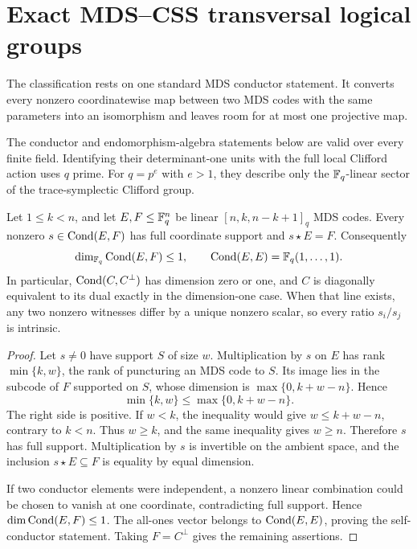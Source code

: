 \section{Exact MDS--CSS transversal logical groups}
\label{sec:exact-logical}

The classification rests on one standard MDS conductor statement.  It
converts every nonzero coordinatewise map between two MDS codes with the same
parameters into an isomorphism and leaves room for at most one projective
map.

The conductor and endomorphism-algebra statements below are valid over every
finite field.  Identifying their determinant-one units with the full local
Clifford action uses \(q\) prime.  For \(q=p^e\) with \(e>1\), they describe
only the \(\mathbb F_q\)-linear sector of the trace-symplectic Clifford group.

\begin{proposition}
\label{prop:diagonal-multiplier-line}
Let \(1\leq k<n\), and let \(E,F\leq\mathbb F_q^n\) be linear
\([n,k,n-k+1]_q\) MDS codes.
Every nonzero \(s\in\operatorname{Cond}(E,F)\) has full coordinate support and
\(s\star E=F\).  Consequently
\[
 \dim_{\mathbb F_q}\operatorname{Cond}(E,F)\leq1,
 \qquad
 \operatorname{Cond}(E,E)=\mathbb F_q(1,\ldots,1).
\]
In particular, \(\operatorname{Cond}(C,C^\perp)\) has dimension zero or one,
and \(C\) is diagonally equivalent to its dual exactly in the
dimension-one case.
When that line exists, any two nonzero witnesses differ by a unique
nonzero scalar, so every ratio \(s_i/s_j\) is intrinsic.
\end{proposition}

\begin{proof}
Let \(s\ne0\) have support \(S\) of size \(w\).  Multiplication by \(s\)
on \(E\) has rank \(\min\{k,w\}\), the rank of puncturing an MDS code to
\(S\).  Its image lies in the subcode of \(F\) supported on \(S\), whose
dimension is \(\max\{0,k+w-n\}\).  Hence
\[
 \min\{k,w\}\leq\max\{0,k+w-n\}.
\]
The right side is positive.  If \(w<k\), the inequality would give
\(w\leq k+w-n\), contrary to \(k<n\).  Thus \(w\geq k\), and the same
inequality gives \(w\geq n\).  Therefore \(s\) has full support.
Multiplication by \(s\) is invertible on the ambient space, and the inclusion
\(s\star E\subseteq F\) is equality by equal dimension.

If two conductor elements were independent, a nonzero linear combination could
be chosen to vanish at one coordinate, contradicting full support.
Hence \(\dim\operatorname{Cond}(E,F)\leq1\).  The all-ones vector belongs to
\(\operatorname{Cond}(E,E)\), proving the self-conductor statement.  Taking
\(F=C^\perp\) gives the remaining assertions.
\end{proof}

